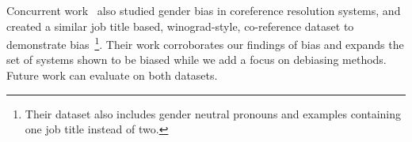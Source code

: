 Concurrent work~\cite{Rachel18} also studied gender bias in coreference resolution systems, and created a similar job title based, winograd-style, co-reference dataset to demonstrate bias~\footnote{Their dataset also includes gender neutral pronouns and examples containing one job title instead of two.}. 
Their work corroborates our findings of bias and expands the set of systems shown to be biased while we add a focus on debiasing methods.
Future work can evaluate on both datasets.




